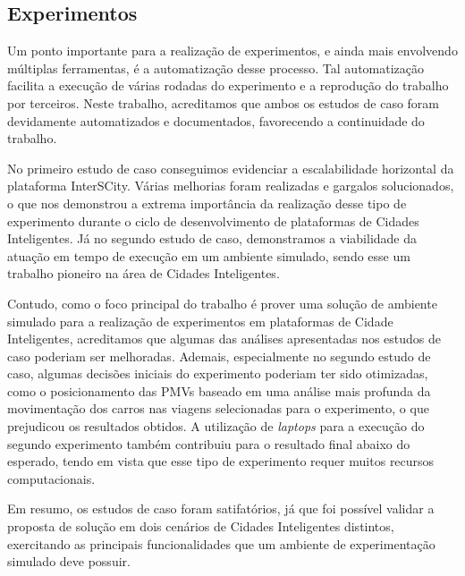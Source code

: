\subsection{Experimentos}

Um ponto importante para a realização de experimentos, e ainda mais envolvendo múltiplas ferramentas, é a automatização desse processo.
Tal automatização facilita a execução de várias rodadas do experimento e a reprodução do trabalho por terceiros.
Neste trabalho, acreditamos que ambos os estudos de caso foram devidamente automatizados e documentados, favorecendo a continuidade do trabalho.

No primeiro estudo de caso conseguimos evidenciar a escalabilidade horizontal da plataforma InterSCity.
Várias melhorias foram realizadas e gargalos solucionados, o que nos demonstrou a extrema importância da realização desse tipo de experimento durante o ciclo de desenvolvimento de plataformas de Cidades
Inteligentes.
Já no segundo estudo de caso, demonstramos a viabilidade da atuação em tempo de execução em um ambiente simulado, sendo esse um trabalho pioneiro na área de Cidades Inteligentes.
 
Contudo, como o foco principal do trabalho é prover uma solução de ambiente simulado para a realização de experimentos em plataformas de Cidade Inteligentes, acreditamos que algumas das análises
apresentadas nos estudos de caso poderiam ser melhoradas.
Ademais, especialmente no segundo estudo de caso, algumas decisões iniciais do experimento poderiam ter sido otimizadas, como o posicionamento das PMVs baseado em uma análise mais profunda da movimentação
dos carros nas viagens selecionadas para o experimento, o que prejudicou os resultados obtidos.
A utilização de \textit{laptops} para a execução do segundo experimento também contribuiu para o resultado final abaixo do esperado, tendo em vista que esse tipo de experimento requer muitos recursos
computacionais.

Em resumo, os estudos de caso foram satifatórios, já que foi possível validar a proposta de solução em dois cenários de Cidades Inteligentes distintos, exercitando as principais funcionalidades que
um ambiente de experimentação simulado deve possuir.



